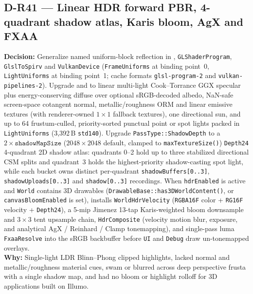 \subsection*{D-R41 --- Linear HDR forward PBR, 4-quadrant shadow atlas, Karis bloom, AgX and FXAA}
\begin{decisionbox}[title={D-R41 \quad 2026-11-19}]
\textbf{Decision:} Generalize named uniform-block reflection in
, \texttt{GLShaderProgram}, \texttt{GlslToSpirv} and
\texttt{VulkanDevice} (\texttt{FrameUniforms} at binding point~0,
\texttt{LightUniforms} at binding point~1; cache formats
\texttt{glsl-program-2} and \texttt{vulkan-pipelines-2}). Upgrade
 and  to linear multi-light
Cook--Torrance GGX specular plus energy-conserving diffuse over optional
sRGB-decoded albedo, NaN-safe screen-space cotangent normal, metallic/roughness
ORM and linear emissive textures (with renderer-owned $1\times 1$ fallback
textures), one directional sun, and up to 64 frustum-culled, priority-sorted
punctual point or spot lights packed in \texttt{LightUniforms} (3,392\,B
\texttt{std140}). Upgrade \texttt{PassType::ShadowDepth} to a
$2 \times \texttt{shadowMapSize}$ ($2048\times 2048$ default, clamped to
\texttt{maxTextureSize()}) \texttt{Depth24} 4-quadrant 2D shadow atlas:
quadrants 0--2 hold up to three stabilized directional CSM splits and
quadrant~3 holds the highest-priority shadow-casting spot light, while each
 bucket owns distinct per-quadrant
\texttt{shadowBuffers[0..3]}, \texttt{shadowUploads[0..3]} and
\texttt{shadow[0..3]} recordings. When \texttt{hdrEnabled} is active and
\texttt{World} contains 3D drawables
(\texttt{DrawableBase::has3DWorldContent()}, or \texttt{canvasBloomEnabled} is
set),  installs
\texttt{WorldHdrVelocity} (\texttt{RGBA16F} color + \texttt{RG16F} velocity +
\texttt{Depth24}), a 5-mip Jimenez 13-tap Karis-weighted bloom downsample and
$3\times 3$ tent upsample chain, \texttt{HdrComposite} (velocity motion blur,
exposure, and analytical AgX / Reinhard / Clamp tonemapping), and single-pass
luma \texttt{FxaaResolve} into the sRGB backbuffer before \texttt{UI} and
\texttt{Debug} draw un-tonemapped overlays.\\
\textbf{Why:} Single-light LDR Blinn--Phong clipped highlights, lacked normal
and metallic/roughness material cues, swam or blurred across deep perspective
frusta with a single shadow map, and had no bloom or highlight rolloff for 3D
applications built on Illumo.\\

\end{decisionbox}
